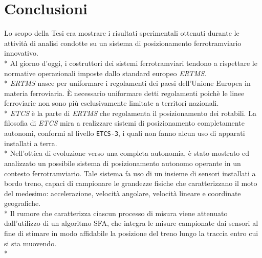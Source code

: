 \chapter{Conclusioni}
Lo scopo della Tesi era mostrare i risultati sperimentali ottenuti durante le attivit\`a di analisi condotte su un sistema di posizionamento ferrotramviario innovativo.\\*
Al giorno d'oggi, i costruttori dei sistemi ferrotramviari tendono a rispettare le normative operazionali imposte dallo standard europeo \emph{ERTMS}.\\*
\emph{ERTMS} nasce per uniformare i regolamenti dei paesi dell'Unione Europea in materia ferroviaria. \`E necessario uniformare detti regolamenti poich\`e le linee ferroviarie non sono pi\`u esclusivamente limitate a territori nazionali.\\*
\emph{ETCS} \`e la parte di \emph{ERTMS} che regolamenta il posizionamento dei rotabili. La filosofia di \emph{ETCS} mira a realizzare sistemi di posizionamento completamente autonomi, conformi al livello \texttt{ETCS-3}, i quali non fanno alcun uso di apparati installati a terra.\\*
Nell'ottica di evoluzione verso una completa autonomia, \`e stato mostrato ed analizzato un possibile sistema di posizionamento autonomo operante in un contesto ferrotramviario. Tale sistema fa uso di un insieme di sensori installati a bordo treno, capaci di campionare le grandezze fisiche che caratterizzano il moto del medesimo: accelerazione, velocit\`a angolare, velocit\`a lineare e coordinate geografiche.\\*
Il rumore che caratterizza ciascun processo di misura viene attenuato dall'utilizzo di un algoritmo SFA, che integra le misure campionate dai sensori al fine di stimare in modo affidabile la posizione del treno lungo la traccia entro cui si sta muovendo.\\*
